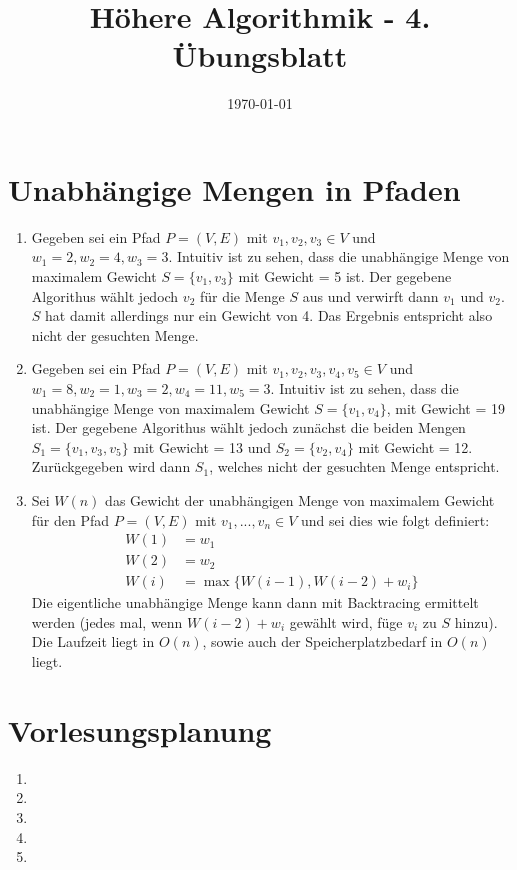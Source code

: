 \documentclass[a4paper,10pt]{article}
\title{H\"ohere Algorithmik - 4. \"Ubungsblatt}
\author{\Authors}
\date{\today}
\begin{document}
\maketitle

\section{Unabhängige Mengen in Pfaden}
\begin{enumerate}
\item   Gegeben sei ein Pfad $P = (V,E)$ mit $v_1,v_2,v_3 \in V$ und $w_1 = 2, w_2 = 4, w_3 = 3$. 
        Intuitiv ist zu sehen, dass die unabhängige Menge von maximalem Gewicht $S = \{v_1, v_3\}$ mit Gewicht = 5 ist. 
        Der gegebene Algorithus wählt jedoch $v_2$ für die Menge $S$ aus und verwirft dann $v_1$ und $v_2$.
        $S$ hat damit allerdings nur ein Gewicht von 4.
        Das Ergebnis entspricht also nicht der gesuchten Menge.
\item   Gegeben sei ein Pfad $P = (V,E)$ mit $v_1,v_2,v_3,v_4,v_5 \in V$ und $w_1 = 8, w_2 = 1, w_3 = 2, w_4 = 11, w_5 = 3$. 
        Intuitiv ist zu sehen, dass die unabhängige Menge von maximalem Gewicht $S = \{v_1, v_4\}$, mit Gewicht = 19 ist. 
        Der gegebene Algorithus wählt jedoch zunächst die beiden Mengen $S_1 = \{v_1, v_3, v_5\}$ mit Gewicht = 13 und $S_2 = \{v_2, v_4\}$ mit Gewicht = 12. 
        Zurückgegeben wird dann $S_1$, welches nicht der gesuchten Menge entspricht.
\item   Sei $W(n)$ das Gewicht der unabhängigen Menge von maximalem Gewicht für den Pfad $P = (V,E)$ mit $v_1, ..., v_n \in V$ 
        und sei dies wie folgt definiert:
        \begin{align*}
            W(1) &= w_1 \\
            W(2) &= w_2 \\
            W(i) &= \max\{W(i-1), W(i-2)+w_i\} 
        \end{align*}
        Die eigentliche unabhängige Menge kann dann mit Backtracing ermittelt werden (jedes mal, wenn $W(i-2)+w_i$ gewählt wird, füge $v_i$ zu $S$ hinzu).
        Die Laufzeit liegt in $O(n)$, sowie auch der Speicherplatzbedarf in $O(n)$ liegt.
\end{enumerate}

\section{Vorlesungsplanung}
\begin{enumerate}
\item   
\item   
\item   
\item   
\item   
\end{enumerate}
\end{document}
